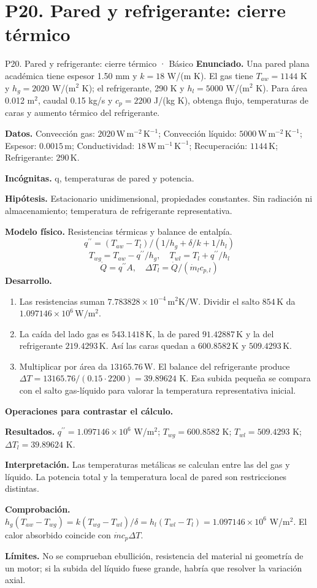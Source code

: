\section{P20. Pared y refrigerante: cierre térmico}
\begin{studiumworked}{P20. Pared y refrigerante: cierre térmico · Básico}
\textbf{Enunciado.} Una pared plana académica tiene espesor 1.50 mm y $k=18$ W/(m K). El gas tiene $T_{aw}=1144$ K y $h_g=2020$ W/(m$^2$ K); el refrigerante, 290 K y $h_l=5000$ W/(m$^2$ K). Para área 0.012 m$^2$, caudal 0.15 kg/s y $c_p=2200$ J/(kg K), obtenga flujo, temperaturas de caras y aumento térmico del refrigerante.

\textbf{Datos.} Convección gas: $2020\,\mathrm{W\,m^{-2}\,K^{-1}}$; Convección líquido: $5000\,\mathrm{W\,m^{-2}\,K^{-1}}$; Espesor: $0.0015\,\mathrm{m}$; Conductividad: $18\,\mathrm{W\,m^{-1}\,K^{-1}}$; Recuperación: $1144\,\mathrm{K}$; Refrigerante: $290\,\mathrm{K}$.

\textbf{Incógnitas.} q, temperaturas de pared y potencia.

\textbf{Hipótesis.} Estacionario unidimensional, propiedades constantes. Sin radiación ni almacenamiento; temperatura de refrigerante representativa.

\textbf{Modelo físico.} Resistencias térmicas y balance de entalpía.
\[q^{\prime\prime}=(T_{aw}-T_l)/(1/h_g+\delta/k+1/h_l)\]
\[T_{wg}=T_{aw}-q^{\prime\prime}/h_g,\quad T_{wl}=T_l+q^{\prime\prime}/h_l\]
\[\dot Q=q^{\prime\prime}A,\quad \Delta T_l=\dot Q/(\dot m_lc_{p,l})\]
\textbf{Desarrollo.}
\begin{enumerate}
\item Las resistencias suman $7.783828\times10^{-4}\,\mathrm{m^2K/W}$. Dividir el salto $854\,\mathrm{K}$ da $1.097146\times10^{6}\,\mathrm{W/m^2}$.
\item La caída del lado gas es $543.1418\,\mathrm{K}$, la de pared $91.42887\,\mathrm{K}$ y la del refrigerante $219.4293\,\mathrm{K}$. Así las caras quedan a $600.8582\,\mathrm{K}$ y $509.4293\,\mathrm{K}$.
\item Multiplicar por área da $13165.76\,\mathrm{W}$. El balance del refrigerante produce $\Delta T=13165.76/(0.15\cdot2200)=39.89624$ K. Esa subida pequeña se compara con el salto gas-líquido para valorar la temperatura representativa inicial.
\end{enumerate}
\textbf{Operaciones para contrastar el cálculo.}

\textbf{Resultados.} $q^{\prime\prime}=1.097146\times10^{6}$ W/m$^2$; $T_{wg}=600.8582$ K; $T_{wl}=509.4293$ K; $\Delta T_l=39.89624$ K.

\textbf{Interpretación.} Las temperaturas metálicas se calculan entre las del gas y líquido. La potencia total y la temperatura local de pared son restricciones distintas.

\textbf{Comprobación.} $h_g(T_{aw}-T_{wg})=k(T_{wg}-T_{wl})/\delta=h_l(T_{wl}-T_l)=1.097146\times10^{6}$ W/m$^2$. El calor absorbido coincide con $\dot m c_p\Delta T$.

\textbf{Límites.} No se comprueban ebullición, resistencia del material ni geometría de un motor; si la subida del líquido fuese grande, habría que resolver la variación axial.
\end{studiumworked}
